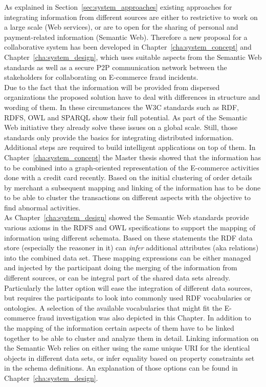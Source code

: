 As explained in Section~\ref{sec:system_approaches} existing approaches for integrating information from different sources are either to restrictive to work on a large scale (Web services), or are to open for the sharing of personal and payment-related information (Semantic Web). Therefore a new proposal for a collaborative system has been developed in Chapter~\ref{cha:system_concept} and Chapter~\ref{cha:system_design}, which uses suitable aspects from the Semantic Web standards as well as a secure \gls{P2P} communication network between the stakeholders for collaborating on \gls{E-commerce} fraud incidents. \\

Due to the fact that the information will be provided from dispersed organizations the proposed solution have to deal with differences in structure and wording of them. In these circumstances the \gls{W3C} standards such as \gls{RDF}, \gls{RDFS}, \gls{OWL} and \gls{SPARQL} show their full potential. As part of the Semantic Web initiative they already solve these issues on a global scale. Still, those standards only provide the basics for integrating distributed information. Additional steps are required to build intelligent applications on top of them. In Chapter~\ref{cha:system_concept} the Master thesis showed that the information has to be combined into a graph-oriented representation of the \gls{E-commerce} activities done with a credit card recently. Based on the initial clustering of order details by merchant a subsequent mapping and linking of the information has to be done to be able to cluster the transactions on different aspects with the objective to find abnormal activities. \\

As Chapter~\ref{cha:system_design} showed the Semantic Web standards provide various axioms in the \gls{RDFS} and \gls{OWL} specifications to support the mapping of information using different schemata. Based on these statements the \gls{RDF} data store (especially the reasoner in it) can \emph{infer} additional attributes (aka relations) into the combined data set. These mapping expressions can be either managed and injected by the participant doing the merging of the information from different sources, or can be integral part of the shared data sets already. Particularly the latter option will ease the integration of different data sources, but requires the participants to look into commonly used \gls{RDF} vocabularies or ontologies. A selection of the available vocabularies that might fit the \gls{E-commerce} fraud investigation was also depicted in this Chapter. In addition to the mapping of the information certain aspects of them have to be linked together to be able to cluster and analyze them in detail. Linking information on the Semantic Web relies on either using the same unique \gls{URI} for the identical objects in different data sets, or infer equality based on property constraints set in the schema definitions. An explanation of those options can be found in Chapter~\ref{cha:system_design}. \\

